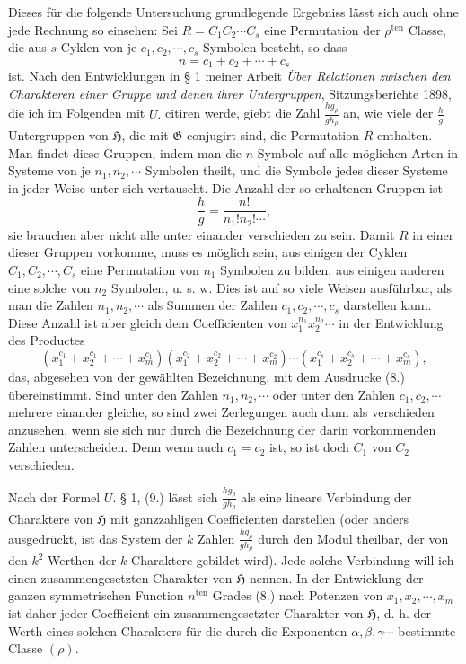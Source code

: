\documentclass[11pt]{article}
\newcommand{\Hgr}{\mathfrak{H}}
\newcommand{\Ggr}{\mathfrak{G}}
\newcommand{\ten}{\mathrm{ten}}
\begin{document}
Dieses für die folgende Untersuchung grundlegende Ergebniss lässt sich auch ohne jede Rechnung so einsehen: Sei $R=C_1C_2\cdots C_s$ eine Permutation der $\rho^{\ten}$ Classe, die aus $s$ Cyklen von je $c_1,c_2,\cdots,c_s$ Symbolen besteht, so dass
\begin{equation}\tag{9.}
 n=c_1+c_2+\cdots+c_s
\end{equation}
ist. Nach den Entwicklungen in § 1 meiner Arbeit \emph{Über Relationen zwischen den Charakteren einer Gruppe und denen ihrer Untergruppen}, Sitzungsberichte 1898, die ich im Folgenden mit $U.$ citiren werde, giebt die Zahl $\frac{h g_\rho}{g h_\rho}$ an, wie viele der $\frac{h}{g}$ Untergruppen von $\Hgr$, die mit $\Ggr$ conjugirt sind, die Permutation $R$ enthalten. Man findet diese Gruppen, indem man die $n$ Symbole auf alle möglichen Arten in Systeme von je $n_1,n_2,\cdots$ Symbolen theilt, und die Symbole jedes dieser Systeme in jeder Weise unter sich vertauscht. Die Anzahl der so erhaltenen Gruppen ist
\[
 \frac{h}{g}=\frac{n!}{n_1!n_2!\cdots},
\]
sie brauchen aber nicht alle unter einander verschieden zu sein. Damit $R$ in einer dieser Gruppen vorkomme, muss es möglich sein, aus einigen der Cyklen $C_1,C_2,\cdots,C_s$ eine Permutation von $n_1$ Symbolen zu bilden, aus einigen anderen eine solche von $n_2$ Symbolen, u. s. w. Dies ist auf so viele Weisen ausführbar, als man die Zahlen $n_1,n_2,\cdots$ als Summen der Zahlen $c_1,c_2,\cdots,c_s$ darstellen kann. Diese Anzahl ist aber gleich dem Coefficienten von $x_1^{n_1}x_2^{n_2}\cdots$ in der Entwicklung des Productes
\begin{equation}\tag{10.}
 (x_1^{c_1}+x_2^{c_1}+\cdots+x_m^{c_1})(x_1^{c_2}+x_2^{c_2}+\cdots+x_m^{c_2})\cdots
 (x_1^{c_s}+x_2^{c_s}+\cdots+x_m^{c_s}),
\end{equation}
das, abgesehen von der gewählten Bezeichnung, mit dem Ausdrucke (8.) übereinstimmt. Sind unter den Zahlen $n_1,n_2,\cdots$ oder unter den Zahlen $c_1,c_2,\cdots$ mehrere einander gleiche, so sind zwei Zerlegungen auch dann als verschieden anzusehen, wenn sie sich nur durch die Bezeichnung der darin vorkommenden Zahlen unterscheiden. Denn wenn auch $c_1=c_2$ ist, so ist doch $C_1$ von $C_2$ verschieden.

Nach der Formel $U.$ § 1, (9.) lässt sich $\frac{h g_\rho}{g h_\rho}$ als eine lineare Verbindung der Charaktere von $\Hgr$ mit ganzzahligen Coefficienten darstellen (oder anders ausgedrückt, ist das System der $k$ Zahlen $\frac{h g_\rho}{g h_\rho}$ durch den Modul theilbar, der von den $k^2$ Werthen der $k$ Charaktere gebildet wird). Jede solche Verbindung will ich einen zusammengesetzten Charakter von $\Hgr$ nennen. In der Entwicklung der ganzen symmetrischen Function $n^{\ten}$ Grades (8.) nach Potenzen von $x_1,x_2,\cdots,x_m$ ist daher jeder Coefficient ein zusammengesetzter Charakter von $\Hgr$, d. h. der Werth eines solchen Charakters für die durch die Exponenten $\alpha,\beta,\gamma\cdots$ bestimmte Classe $(\rho)$.
\end{document}
